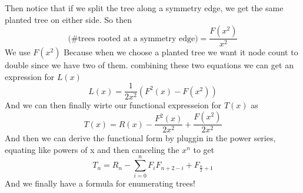 \documentclass{article}
\begin{document}
Then notice that if we split the tree along a symmetry edge, we get the same planted tree on either side. So then 
\begin{equation}
\text{(\# trees rooted at a symmetry edge)}=\frac{F(x^2)}{x^2}
\end{equation}
We use \(F(x^2)\)  Because when we choose a planted tree we want it node count to double since we have two of them. combining these two equations we can get an expression for \(L(x)\)
\begin{equation}
L(x)= \frac{1}{2x^2}(F^2(x)-F(x^2))
\end{equation}
And we can then finally wirte our functional expresseion for \(T(x)\) as
\begin{equation}
T(x)=R(x) -\frac{F^2(x)}{2x^2}+\frac{F(x^2)}{2x^2}
\end{equation}
And then we can derive the functional form by pluggin in the power series, equating like powers of x and then canceling the \(x^n\) to get
\begin{equation}
T_n=R_n-\sum_{i=0}^nF_iF_{n+2-i} + F_{\frac{n}{2}+1}
\end{equation}
And we finally have a formula for enumerating trees!
\end{document}
